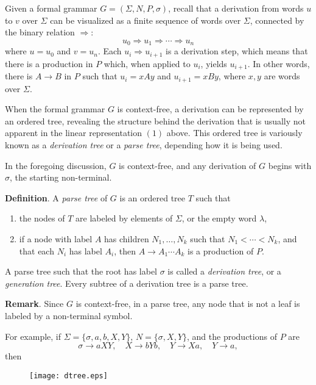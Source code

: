 \documentclass[12pt]{article}
\begin{document}
Given a formal grammar $G=(\Sigma,N,P,\sigma)$, recall that a derivation from words $u$ to $v$ over $\Sigma$ can be visualized as a finite sequence of words over $\Sigma$, connected by the binary relation $\Rightarrow$:
\begin{equation}
u_0 \Rightarrow u_1 \Rightarrow \cdots \Rightarrow u_n
\end{equation}
where $u=u_0$ and $v=u_n$.  Each $u_i \Rightarrow u_{i+1}$ is a derivation step, which means that there is a production in $P$ which, when applied to $u_i$, yields $u_{i+1}$.  In other words, there is $A\to B$ in $P$ such that $u_i=xAy$ and $u_{i+1}=xBy$, where $x,y$ are words over $\Sigma$.

When the formal grammar $G$ is context-free, a derivation can be represented by an ordered tree, revealing the structure behind the derivation that is usually not apparent in the linear representation $(1)$ above.  This ordered tree is variously known as a \emph{derivation tree} or a \emph{parse tree}, depending how it is being used.

In the foregoing discussion, $G$ is context-free, and any derivation of $G$ begins with $\sigma$, the starting non-terminal.

\textbf{Definition}.  A \emph{parse tree} of $G$ is an ordered tree $T$ such that
\begin{enumerate}
\item the nodes of $T$ are labeled by elements of $\Sigma$, or the empty word $\lambda$,
\item if a node with label $A$ has children $N_1, \ldots, N_k$ such that $N_1 < \cdots < N_k$, and that each $N_i$ has label $A_i$, then $A \to A_1 \cdots A_k$ is a production of $P$.
\end{enumerate}

A parse tree such that the root has label $\sigma$ is called a \emph{derivation tree}, or a \emph{generation tree}.  Every subtree of a derivation tree is a parse tree.

\textbf{Remark}.  Since $G$ is context-free, in a parse tree, any node that is not a leaf is labeled by a non-terminal symbol.

For example, if $\Sigma = \lbrace \sigma, a, b, X, Y\rbrace$, $N=\lbrace \sigma, X, Y\rbrace$, and the productions of $P$ are $$\sigma \to aXY, \quad X\to bYb, \quad Y\to Xa, \quad Y\to a,$$ then 

\begin{figure}[!htp]
\centering
\texttt{[image: dtree.eps]}
\end{figure}
\end{document}
